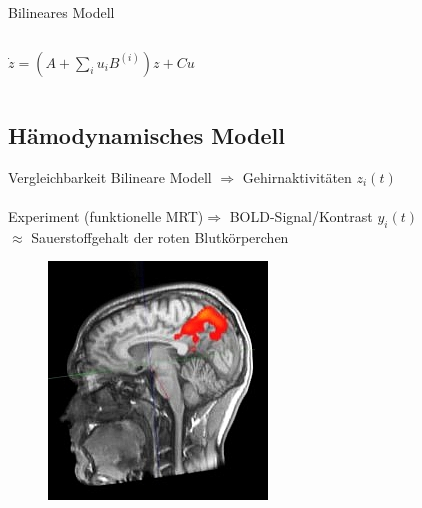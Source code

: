 \documentclass{beamer}
\begin{document}
\begin{frame}{Bilineares Modell}
\begin{columns}
{\begin{minipage}{\textwidth}
					\hspace{5pt}
					$
					\dot{z} =(A+\sum_{i}u_iB^{(i)})z+Cu
					$
				\end{minipage}	
			}
		\end{columns}
	\end{frame}	
	
\subsection{Hämodynamisches Modell}
\begin{frame}{Vergleichbarkeit}
Bilineare Modell $\Rightarrow$ Gehirnaktivitäten $z_i(t)$\\~\\
Experiment (funktionelle MRT)$\Rightarrow$ BOLD-Signal/Kontrast $y_i(t)$\\
\hspace{3cm} $\approx$ Sauerstoffgehalt der roten Blutkörperchen 
\begin{figure}
{\includegraphics[width=0.3 \textwidth]{res/bold_signal.jpg}}
\end{figure}
\end{frame}
\end{document}
